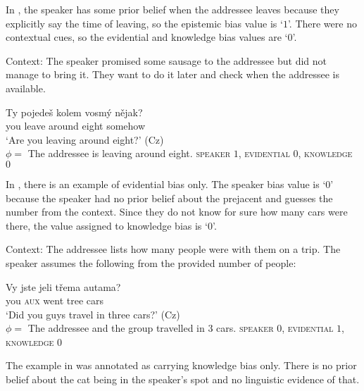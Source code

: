 \documentclass[output=paper,colorlinks,citecolor=brown]{langscibook}
\begin{document}
\noindent In , the speaker has some prior belief when the addressee leaves because they explicitly say the time of leaving, so the epistemic bias value is `$1$'. There were no contextual cues, so the evidential and knowledge bias values are `$0$'.  

\begin{exe}
\ex Context: The speaker promised some sausage to the addressee but did not manage to bring it. They want to do it later and check when the addressee is available.
    \begin{xlist}
     \gll Ty pojedeš kolem vosmý nějak? \\
    you leave around eight somehow \\
    \glt `Are you leaving around eight?' \hfill (Cz)\\
    $\phi={}$  The addressee is leaving around eight. 
    \label{ex-czbiasEPI}
     \textsc{speaker} $1$, \textsc{evidential} $0$, \textsc{knowledge} $0$
    \end{xlist}

\end{exe}

\noindent In , there is an example of evidential bias only. The speaker bias value is `$0$' because the speaker had no prior belief about the prejacent and guesses the number from the context. Since they do not know for sure how many cars were there, the value assigned to knowledge bias is `$0$'. 
\begin{exe}
\ex Context: The addressee lists how many people were with them on a trip. The speaker assumes the following from the provided number of people:
    \begin{xlist}
     \gll Vy jste jeli třema autama? \\
    you \textsc{aux} went tree cars \\
    \glt `Did you guys travel in three cars?' \hfill (Cz)\\
    $\phi={}$ The addressee and the group travelled in 3 cars. 
    \label{ex-czbiaseSE}
     \textsc{speaker} $0$, \textsc{evidential} $1$, \textsc{knowledge} $0$
    \end{xlist}

\end{exe}

\noindent The example in  was annotated as carrying knowledge bias only. There is no prior belief about the cat being in the speaker's spot and no linguistic evidence of that.
\end{document}
